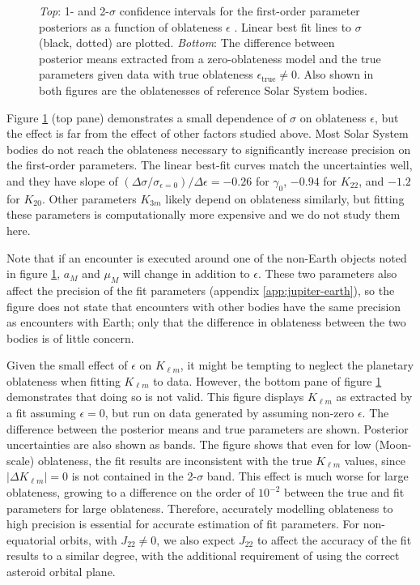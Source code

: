 \documentclass[fleqn,usenatbib]{mnras}
\begin{document}
\begin{figure}
  \caption{\textit{Top}: 1- and 2-$\sigma$ confidence intervals for the first-order parameter posteriors as a function of oblateness $\epsilon$ . Linear best fit lines to $\sigma$ (black, dotted) are plotted. \textit{Bottom}: The difference between posterior means extracted from a zero-oblateness model and the true parameters given data with true oblateness $\epsilon_\text{true} \neq 0$. Also shown in both figures are the oblatenesses of reference Solar System bodies.}
  \label{fig:scan-oblateness}
\end{figure}

Figure \ref{fig:scan-oblateness} (top pane) demonstrates a small dependence of $\sigma$ on oblateness $\epsilon$, but the effect is far from the effect of other factors studied above. Most Solar System bodies do not reach the oblateness necessary to significantly increase precision on the first-order parameters. The linear best-fit curves match the uncertainties well, and they have slope of $(\Delta \sigma / \sigma_{\epsilon=0}) / \Delta \epsilon = -0.26$ for $\gamma_0$, $-0.94$ for $K_{22}$, and $-1.2$ for $K_{20}$. Other parameters $K_{3m}$ likely depend on oblateness similarly, but fitting these parameters is computationally more expensive and we do not study them here.

Note that if an encounter is executed around one of the non-Earth objects noted in figure \ref{fig:scan-oblateness}, $a_M$ and $\mu_M$ will change in addition to $\epsilon$. These two parameters also affect the precision of the fit parameters (appendix \ref{app:jupiter-earth}), so the figure does not state that encounters with other bodies have the same precision as encounters with Earth; only that the difference in oblateness between the two bodies is of little concern.

Given the small effect of $\epsilon$ on $K_{\ell m}$, it might be tempting to neglect the planetary oblateness when fitting $K_{\ell m}$ to data. However, the bottom pane of figure \ref{fig:scan-oblateness} demonstrates that doing so is not valid. This figure displays $K_{\ell m}$ as extracted by a fit assuming $\epsilon = 0$, but run on data generated by assuming non-zero $\epsilon$. The difference between the posterior means and true parameters are shown. Posterior uncertainties are also shown as bands. The figure shows that even for low (Moon-scale) oblateness, the fit results are inconsistent with the true $K_{\ell m}$ values, since $|\Delta K_{\ell m}| = 0$ is not contained in the 2-$\sigma$ band. This effect is much worse for large oblateness, growing to a difference on the order of $10^{-2}$ between the true and fit parameters for large oblateness. Therefore, accurately modelling oblateness to high precision is essential for accurate estimation of fit parameters. For non-equatorial orbits, with $J_{22} \neq 0$, we also expect $J_{22}$ to affect the accuracy of the fit results to a similar degree, with the additional requirement of using the correct asteroid orbital plane.
\end{document}
